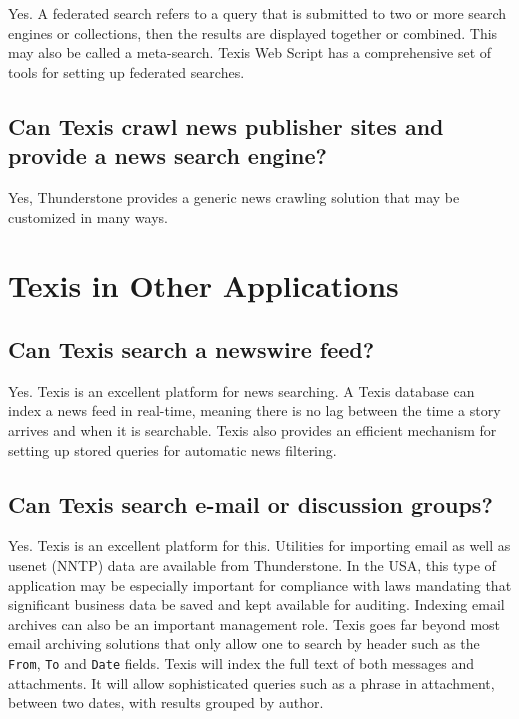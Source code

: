 Yes.  A federated search refers to a query that is submitted to two or
more search engines or collections, then the results are displayed
together or combined.  This may also be called a meta-search.  Texis
Web Script has a comprehensive set of tools for setting up federated
searches.

\section{Can Texis crawl news publisher sites and provide a news search engine? }

Yes, Thunderstone provides a generic news crawling solution that may
be customized in many ways.

\chapter{Texis in Other Applications}

\section{Can Texis search a newswire feed? }

Yes.  Texis is an excellent platform for news searching.  A Texis
database can index a news feed in real-time, meaning there is no lag
between the time a story arrives and when it is searchable.  Texis
also provides an efficient mechanism for setting up stored queries for
automatic news filtering.

\section{Can Texis search e-mail or discussion groups? }

Yes.  Texis is an excellent platform for this.  Utilities for
importing email as well as usenet (NNTP) data are available from
Thunderstone.  In the USA, this type of application may be especially
important for compliance with laws mandating that significant business
data be saved and kept available for auditing. Indexing email archives
can also be an important management role.  Texis goes far beyond most
email archiving solutions that only allow one to search by header such
as the \verb`From`, \verb`To` and \verb`Date` fields.  Texis will
index the full text of both messages and attachments.  It will allow
sophisticated queries such as a phrase in attachment, between two
dates, with results grouped by author.

